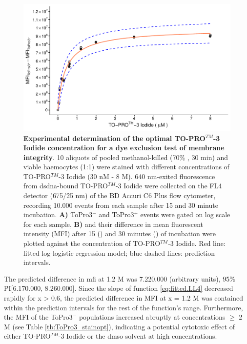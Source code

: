 \begin{figure}[h]
    \centering
    \includegraphics[width=1.0\textwidth]{figures/Method development/ToPro3 LL4.pdf}
    \caption{\textbf{Experimental determination of the optimal TO-PRO$^{TM}$-3 Iodide concentration for a dye exclusion test of membrane integrity}. 10 aliquots of pooled methanol-killed (70\% , 30 min) and viable haemocytes (1:1) were stained with different concentrations of TO-PRO$^{TM}$-3 Iodide (30 nM - 8 \micro M). 640 nm-exited fluorescence from \acrshort{dsdna}-bound TO-PRO$^{TM}$-3 Iodide were collected on the FL4 detector (675/25 nm) of the BD Accuri C6 Plus flow cytometer, recording 10.000 events from each sample after 15 and 30 minute incubation. \textbf{A)} ToPro3$^{-}$ and ToPro3$^{+}$ events were gated on log scale for each sample, \textbf{B)} and their difference in mean fluorescent intensity (MFI) after 15 (\protect\lysegraacircle) and 30 minutes (\protect\darkgraycircle) of incubation were plotted against the concentration of TO-PRO$^{TM}$-3 Iodide. Red line: fitted log-logistic regression model; blue dashed lines: prediction intervals.}
    \label{fig:ToPro3_stain_opt}
\end{figure}

The predicted difference in \acrshort{mfi} at 1.2 \micro M was 7.220.000 (arbitrary units), 95\% PI[6.170.000, 8.260.000]. Since the slope of function \ref{eq:fitted.LL4} decreased rapidly for x > 0.6, the predicted difference in MFI at x = 1.2 \micro M was contained within the prediction intervals for the rest of the function's range. Furthermore, the MFI of the ToPro3$^{-}$ populations increased abruptly at concentrations $\geq$ 2 \micro M (see Table \ref{tb:ToPro3_stainopt}), indicating a potential cytotoxic effect of either TO-PRO$^{TM}$-3 Iodide or the \acrshort{dmso} solvent at high concentrations.


